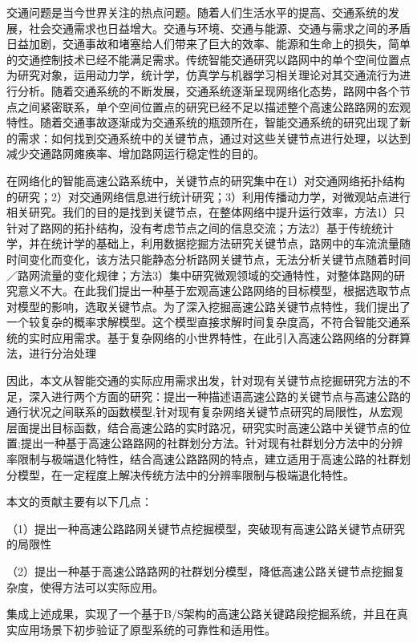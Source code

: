 
\begin{cabstract}

		交通问题是当今世界关注的热点问题。随着人们生活水平的提高、交通系统的发展，社会交通需求也日益增大。交通与环境、交通与能源、交通与需求之间的矛盾日益加剧，交通事故和堵塞给人们带来了巨大的效率、能源和生命上的损失，简单的交通控制技术已经不能满足需求。传统智能交通研究以路网中的单个空间位置点为研究对象，运用动力学，统计学，仿真学与机器学习相关理论对其交通流行为进行分析。随着交通系统的不断发展，交通系统逐渐呈现网络化态势，路网中各个节点之间紧密联系，单个空间位置点的研究已经不足以描述整个高速公路路网的宏观特性。随着交通事故逐渐成为交通系统的瓶颈所在，智能交通系统的研究出现了新的需求：如何找到交通系统中的关键节点，通过对这些关键节点进行处理，以达到减少交通路网瘫痪率、增加路网运行稳定性的目的。

		在网络化的智能高速公路系统中，关键节点的研究集中在1）对交通网络拓扑结构的研究；2）对交通网络信息进行统计研究；3）利用传播动力学，对微观站点进行相关研究。我们的目的是找到关键节点，在整体网络中提升运行效率，方法1）只针对了路网的拓扑结构，没有考虑节点之间的信息交流；方法2）基于传统统计学，并在统计学的基础上，利用数据挖掘方法研究关键节点，路网中的车流流量随时间变化而变化，该方法只能静态分析路网关键节点，无法分析关键节点随着时间／路网流量的变化规律；方法3）集中研究微观领域的交通特性，对整体路网的研究意义不大。在此我们提出一种基于宏观高速公路网络的目标模型，根据选取节点对模型的影响，选取关键节点。为了深入挖掘高速公路关键节点特性，我们提出了一个较复杂的概率求解模型。这个模型直接求解时间复杂度高，不符合智能交通系统的实时应用需求。基于复杂网络的小世界特性，在此引入高速公路网络的分群算法，进行分治处理

		因此，本文从智能交通的实际应用需求出发，针对现有关键节点挖掘研究方法的不足，深入进行两个方面的研究：提出一种描述语高速公路的关键节点与高速公路的通行状况之间联系的函数模型,针对现有复杂网络关键节点研究的局限性，从宏观层面提出目标函数，结合高速公路的实时路况，研究实时高速公路中关键节点的位置;提出一种基于高速公路路网的社群划分方法。针对现有社群划分方法中的分辨率限制与极端退化特性，结合高速公路路网的特点，建立适用于高速公路的社群划分模型，在一定程度上解决传统方法中的分辨率限制与极端退化特性。

        本文的贡献主要有以下几点：
        
		（1）提出一种高速公路路网关键节点挖掘模型，突破现有高速公路关键节点研究的局限性
		
		（2）提出一种基于高速公路路网的社群划分模型，降低高速公路关键节点挖掘复杂度，使得方法可以实际应用。

		集成上述成果，实现了一个基于B/S架构的高速公路关键路段挖掘系统，并且在真实应用场景下初步验证了原型系统的可靠性和适用性。
\end{cabstract}

